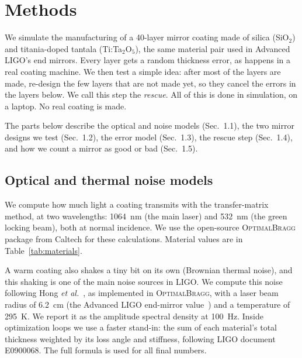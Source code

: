 
\section{Methods}

We simulate the manufacturing of a 40-layer mirror coating made of
silica (SiO$_2$) and titania-doped tantala (Ti:Ta$_2$O$_5$), the same
material pair used in Advanced LIGO's end mirrors. Every layer gets a
random thickness error, as happens in a real coating machine. We then
test a simple idea: after most of the layers are made, re-design the
few layers that are not made yet, so they cancel the errors in the
layers below. We call this step the \emph{rescue}. All of this is done
in simulation, on a laptop. No real coating is made.

The parts below describe the optical and noise models (Sec.~1.1), the
two mirror designs we test (Sec.~1.2), the error model (Sec.~1.3), the
rescue step (Sec.~1.4), and how we count a mirror as good or bad
(Sec.~1.5).

\subsection{Optical and thermal noise models}

We compute how much light a coating transmits with the transfer-matrix
method, at two wavelengths: 1064~nm (the main laser) and 532~nm (the
green locking beam), both at normal incidence. We use the open-source
\textsc{OptimalBragg} package from Caltech \cite{Venugopalan2024} for
these calculations. Material values are in Table~\ref{tab:materials}.

A warm coating also shakes a tiny bit on its own (Brownian thermal
noise), and this shaking is one of the main noise sources in LIGO. We
compute this noise following Hong \emph{et al.}~\cite{Hong2013}, as
implemented in \textsc{OptimalBragg}, with a laser beam radius of
6.2~cm (the Advanced LIGO end-mirror value~\cite{aLIGO2015}) and a temperature of 295~K. We report it as the amplitude
spectral density at 100~Hz. Inside optimization loops we use a faster
stand-in: the sum of each material's total thickness weighted by its
loss angle and stiffness, following LIGO document E0900068. The full
formula is used for all final numbers.

